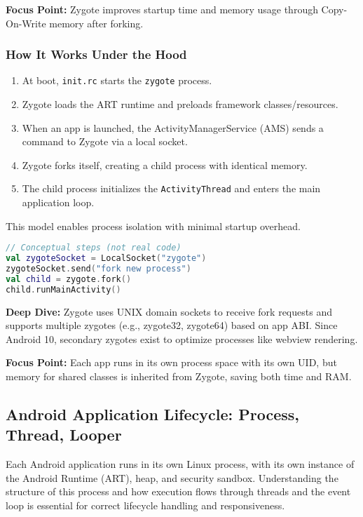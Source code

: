 \documentclass[a4paper,12pt]{article}
\begin{document}
\textbf{Focus Point:} Zygote improves startup time and memory usage through Copy-On-Write memory after forking.

\subsubsection{How It Works Under the Hood}

\begin{enumerate}
  \item At boot, \texttt{init.rc} starts the \texttt{zygote} process.
  \item Zygote loads the ART runtime and preloads framework classes/resources.
  \item When an app is launched, the ActivityManagerService (AMS) sends a command to Zygote via a local socket.
  \item Zygote forks itself, creating a child process with identical memory.
  \item The child process initializes the \texttt{ActivityThread} and enters the main application loop.
\end{enumerate}

This model enables process isolation with minimal startup overhead.

\begin{lstlisting}[language=Kotlin]
// Conceptual steps (not real code)
val zygoteSocket = LocalSocket("zygote")
zygoteSocket.send("fork new process")
val child = zygote.fork()
child.runMainActivity()
\end{lstlisting}

\textbf{Deep Dive:} Zygote uses UNIX domain sockets to receive fork requests and supports multiple zygotes (e.g., zygote32, zygote64) based on app ABI. Since Android 10, secondary zygotes exist to optimize processes like webview rendering.

\textbf{Focus Point:} Each app runs in its own process space with its own UID, but memory for shared classes is inherited from Zygote, saving both time and RAM.

\subsection{Android Application Lifecycle: Process, Thread, Looper}

Each Android application runs in its own Linux process, with its own instance of the Android Runtime (ART), heap, and security sandbox. Understanding the structure of this process and how execution flows through threads and the event loop is essential for correct lifecycle handling and responsiveness.
\end{document}
